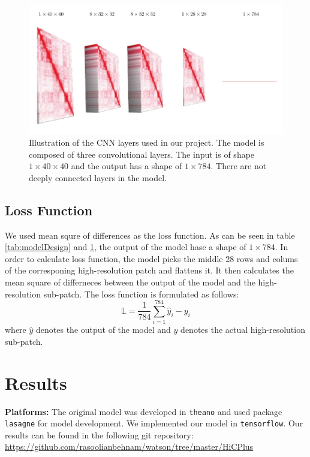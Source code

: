 \documentclass{article}
\begin{document}
\begin{figure}[H]
    \centering
    \includegraphics[width=\textwidth]{model.jpg}
    \caption{Illustration of the CNN layers used in
    our project. The model is composed of three
    convolutional layers. The input is of shape
    $1\times40\times40$ and the output has a
    shape of $1\times784$. There are not deeply
    connected layers in the model.}
    \label{fig:modelDesign}
\end{figure}
\subsection{Loss Function}
We used mean squre of
differences as the loss function. As can be
seen in table \ref{tab:modelDesign} and 
\ref{fig:modelDesign}, the output of
the model hase a shape of $1 \times 784$.
In order to calculate loss function,
the model picks the middle 28 rows and colums of the
corresponing high-resolution patch and flattens
it. It then calculates the mean square of differneces
between the output of the model and the high-resolution
sub-patch. The loss function is formulated as follows:
\begin{equation}
    \mathbb{L} = 
    \frac{1}{784}\sum_{i=1}^{784}{\hat{y}_i - y_i}
\end{equation}
where $\hat{y}$ denotes the output of the model and
$y$ denotes the actual high-resolution sub-patch.
\section{Results}
\textbf{Platforms:}
The original model was developed in \texttt{theano}
and used package \texttt{lasagne} for model development.
We implemented our model in \texttt{tensorflow}. Our 
results can be found in the following git repository:\\
\url{https://github.com/rasoolianbehnam/watson/tree/master/HiCPlus}\\
\end{document}
